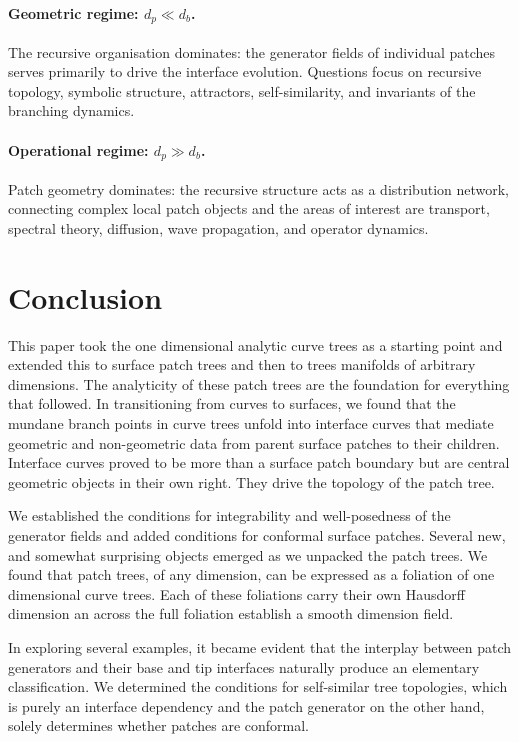\documentclass[11pt,a4paper]{article}
\begin{document}
\paragraph{Geometric regime: $d_p \ll d_b$.}
The recursive organisation dominates: the generator fields of individual patches serves 
primarily to drive the interface evolution. Questions focus on recursive 
topology, symbolic structure, attractors, self-similarity, and invariants of the 
branching dynamics.

\paragraph{Operational regime: $d_p \gg d_b$.}
Patch geometry dominates: the recursive structure acts as a distribution network, 
connecting complex local patch objects and the areas of interest are transport, spectral 
theory, diffusion, wave propagation, and operator dynamics.

\section{Conclusion}
\label{sec:conclusion}

This paper took the one dimensional analytic curve trees as a starting point and extended
this to surface patch trees and then to trees manifolds of arbitrary dimensions. The analyticity of these
patch trees are the foundation for everything that followed. In transitioning from curves 
to surfaces, we found that the mundane branch points in curve trees unfold into interface 
curves that mediate geometric and non-geometric data from parent surface patches to their 
children. Interface curves proved to be more than a surface patch boundary but are 
central geometric objects in their own right. They drive the topology of the patch tree.

We established the conditions for integrability and well-posedness of the generator fields 
and added conditions for conformal surface patches. Several new, and somewhat surprising 
objects emerged as we unpacked the patch trees. We found that patch trees, of any dimension, 
can be expressed as a foliation of one dimensional curve trees. Each of these foliations 
carry their own Hausdorff dimension an across the full foliation establish a smooth dimension 
field.

In exploring several examples, it became evident that the interplay between patch generators and 
their base and tip interfaces naturally produce an elementary classification. We determined the 
conditions for self-similar tree topologies, which is purely an interface dependency and the patch
generator on the other hand, solely determines whether patches are conformal.
\end{document}
